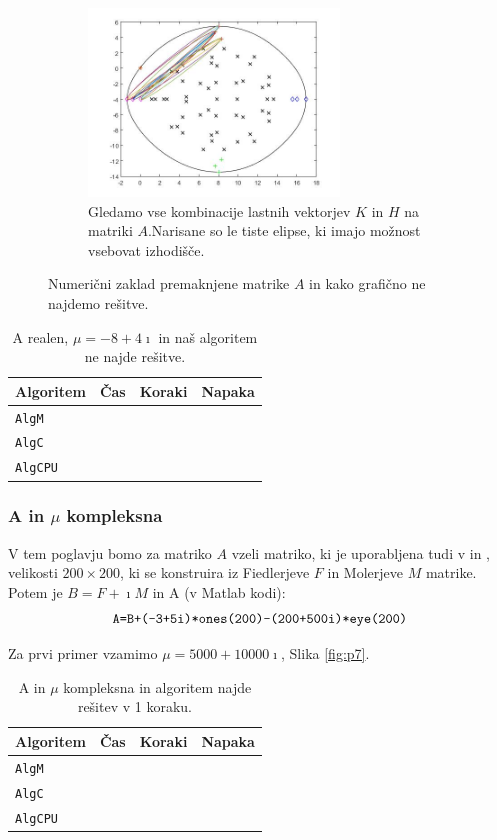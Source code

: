 \documentclass[12pt,a4paper]{amsart}
\theoremstyle{definition}
\theoremstyle{plain}
\begin{document}
\begin{figure}[H]
\begin{subfigure}[t]{0.45\textwidth}
\label{fig:p63}
\end{subfigure}%
\hfill
\begin{subfigure}[t]{0.45\textwidth}
\includegraphics[width=0.9\linewidth,height=5cm]{RC4e3.jpg}
\caption{Gledamo vse kombinacije lastnih vektorjev $K$ in $H$ na matriki $A$.\footnotemark[\value{footnote}] Narisane so le tiste elipse, ki imajo možnost vsebovat izhodišče.}
\label{fig:p63}
\end{subfigure}
\caption{Numerični zaklad premaknjene matrike $A$ in kako grafično ne najdemo rešitve.}
\end{figure}

\begin{table}[H]
\begin{tabular}{|l|l|c|r|}
\hline
Algoritem & Čas & Koraki & Napaka\\
\hline
\hline
\verb+AlgM+ & & & \\
\hline
\verb+AlgC+ & & & \\
\hline
\verb+AlgCPU+ & & & \\
\hline
\end{tabular}
\caption{A realen, $\mu = -8+4\imath$ in naš algoritem ne najde rešitve.}
\label{t6}
\end{table}

\subsubsection{A in $\mu$ kompleksna}
V tem poglavju bomo za matriko $A$ vzeli matriko,  ki je uporabljena tudi v \cite{meurant} in \cite{trije}, velikosti $200\times 200$, ki se konstruira iz Fiedlerjeve $F$ in Molerjeve $M$ matrike. Potem je $B=F + \imath M$ in A (v Matlab kodi):
$$\verb~A=B+(-3+5i)*ones(200)-(200+500i)*eye(200)~$$

Za prvi primer vzamimo $\mu = 5000+10000\imath$, Slika \ref{fig:p7}.


\begin{table}[H]
\begin{tabular}{|l|l|c|r|}
\hline
Algoritem & Čas & Koraki & Napaka\\
\hline
\hline
\verb+AlgM+ & & & \\
\hline
\verb+AlgC+ & & & \\
\hline
\verb+AlgCPU+ & & & \\
\hline
\end{tabular}
\caption{A in $\mu$ kompleksna in algoritem najde rešitev v 1 koraku.}
\label{t7}
\end{table}
\end{document}
